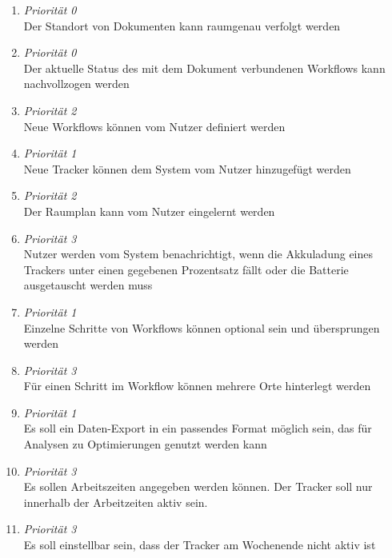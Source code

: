 \begin{enumerate}[label=\textbf{F-\arabic*}]
	\item \label{fa:tracking} \textit{Priorität 0} \\
		Der Standort von Dokumenten kann raumgenau verfolgt werden
	\item \label{fa:workflow} \textit{Priorität 0} \\
		Der aktuelle Status des mit dem Dokument verbundenen Workflows kann nachvollzogen werden
	\item \label{fa:neue-workflows} \textit{Priorität 2} \\
		Neue Workflows können vom Nutzer definiert werden
	\item \label{fa:neue-tracker} \textit{Priorität 1} \\
		Neue Tracker können dem System vom Nutzer hinzugefügt werden
	\item \label{fa:raumplan} \textit{Priorität 2} \\
		Der Raumplan kann vom Nutzer eingelernt werden
	\item \label{fa:benachrichtigung} \textit{Priorität 3} \\
		Nutzer werden vom System benachrichtigt, wenn die Akkuladung eines Trackers unter einen
		gegebenen Prozentsatz fällt oder die Batterie ausgetauscht werden muss
	\item \label{fa:optionale-schritte} \textit{Priorität 1}  \\
		Einzelne Schritte von Workflows können optional sein und übersprungen werden
	\item \label{fa:mehrere-orte} \textit{Priorität 3} \\
		Für einen Schritt im Workflow können mehrere Orte hinterlegt werden
	\item \label{fa:export} \textit{Priorität 1} \\
		Es soll ein Daten-Export in ein passendes Format möglich sein, das für Analysen
	  zu Optimierungen genutzt werden kann
	\item \label{fa:arbeitszeiten} \textit{Priorität 3} \\
		Es sollen Arbeitszeiten angegeben werden können.  Der Tracker soll nur innerhalb der
		Arbeitzeiten aktiv sein.
	\item \label{fa:wochenende} \textit{Priorität 3} \\
		Es soll einstellbar sein, dass der Tracker am Wochenende nicht aktiv ist
\end{enumerate}

